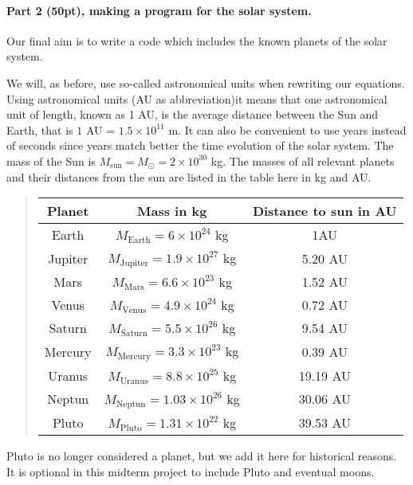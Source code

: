 \documentclass[%
oneside,                 %
final,                   %
10pt]{article}
\begin{document}
\noindent
\paragraph{Part 2 (50pt), making a program for the solar system.}
Our final aim is to write a code which includes the known planets of the solar system. 

We will, as before, use so-called astronomical units when rewriting our equations. 
Using astronomical units (AU as abbreviation)it means that 
one astronomical unit of length, known as 1 AU, is the average distance between the Sun and Earth, that is
$1$ AU = $1.5\times 10^{11}$ m.  It can also be convenient to use years instead of seconds since years match
better the time evolution of the solar system. The mass of the Sun is $M_{\mathrm{sun}}=M_{\odot}=2\times 10^{30}$ kg. The masses of all relevant planets and their distances from the sun are listed in the table here in kg and AU.


\begin{quote}
\begin{tabular}{ccc}
\hline
\multicolumn{1}{c}{ Planet } & \multicolumn{1}{c}{ Mass in kg } & \multicolumn{1}{c}{ Distance to  sun in AU } \\
\hline
Earth   & $M_{\mathrm{Earth}}=6\times 10^{24}$ kg     & 1AU                    \\
Jupiter & $M_{\mathrm{Jupiter}}=1.9\times 10^{27}$ kg & 5.20 AU                \\
Mars    & $M_{\mathrm{Mars}}=6.6\times 10^{23}$ kg    & 1.52 AU                \\
Venus   & $M_{\mathrm{Venus}}=4.9\times 10^{24}$ kg   & 0.72 AU                \\
Saturn  & $M_{\mathrm{Saturn}}=5.5\times 10^{26}$ kg  & 9.54 AU                \\
Mercury & $M_{\mathrm{Mercury}}=3.3\times 10^{23}$ kg & 0.39 AU                \\
Uranus  & $M_{\mathrm{Uranus}}=8.8\times 10^{25}$ kg  & 19.19 AU               \\
Neptun  & $M_{\mathrm{Neptun}}=1.03\times 10^{26}$ kg & 30.06 AU               \\
Pluto   & $M_{\mathrm{Pluto}}=1.31\times 10^{22}$ kg  & 39.53 AU               \\
\hline
\end{tabular}
\end{quote}

\noindent
Pluto is no longer considered a planet, but we add it here for
historical reasons. It is optional in this midterm project to include
Pluto and eventual moons.
\end{document}
